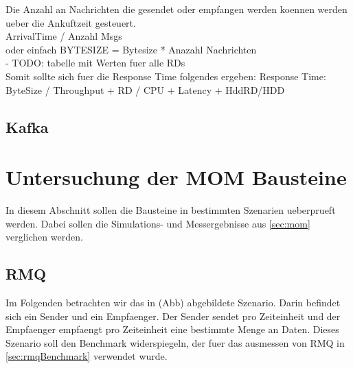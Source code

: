 Die Anzahl an Nachrichten die gesendet oder empfangen werden koennen werden ueber die Ankuftzeit gesteuert.\\
ArrivalTime / Anzahl Msgs \\
oder einfach BYTESIZE = Bytesize * Anazahl Nachrichten \\

- TODO: tabelle mit Werten fuer alle RDs\\

Somit sollte sich fuer die Response Time folgendes ergeben: Response Time: ByteSize / Throughput + RD / CPU + Latency + HddRD/HDD \\








\subsection{Kafka}

\section{Untersuchung der MOM Bausteine}
In diesem Abschnitt sollen die Bausteine in bestimmten Szenarien ueberprueft werden. Dabei sollen die Simulations- und Messergebnisse aus \autoref{sec:mom} verglichen werden.
\subsection{RMQ}
Im Folgenden betrachten wir das in (Abb) abgebildete Szenario. Darin befindet sich ein Sender und ein Empfaenger. Der Sender sendet pro Zeiteinheit und der Empfaenger empfaengt pro Zeiteinheit eine bestimmte Menge an Daten. Dieses Szenario soll den Benchmark widerspiegeln, der fuer das ausmessen von RMQ in \autoref{sec:rmqBenchmark} verwendet wurde.




